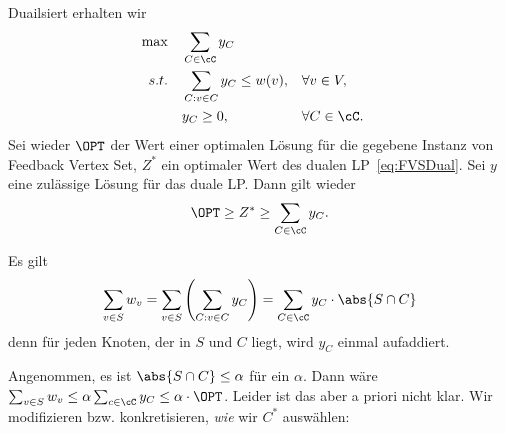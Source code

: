 \documentclass[language=ngerman,algolist]{TemplateLecture}
\begin{document}
Duailsiert erhalten wir 
\begin{equation}
    \begin{aligned}
        \max \quad & \sum_{C \in \cC} y_C \\
        s.t. \quad & \sum_{C: v \in C} y_C \leq w(v), && \forall v \in V, \\
                   & y_C \geq 0, && \forall C \in \cC.
    \end{aligned}\label{eq:FVSDual}
\end{equation}
Sei wieder $\OPT$ der Wert einer optimalen Lösung für die gegebene Instanz von Feedback Vertex Set, $Z^*$ ein optimaler Wert des dualen LP~\eqref{eq:FVSDual}. Sei $y$ eine zulässige Lösung für das duale LP. Dann gilt wieder 
\begin{equation*}
    \OPT \geq Z^* \geq \sum_{C \in \cC} y_C.
\end{equation*}

\begin{algorithm}[h]
    \caption{\textsc{PrimalDual-FVS}}\label{alg:primalDualFVS}
    \begin{algorithmic}[1]
         
        \EndWhile{}
    \end{algorithmic}
\end{algorithm}

Es gilt 
\begin{equation*}
    \sum_{v \in S} w_v = \sum_{v \in S} \left( \sum_{C : v \in C} y_C \right) = \sum_{C \in \cC} y_C \cdot \abs{S \cap C}
\end{equation*}
denn für jeden Knoten, der in $S$ und $C$ liegt, wird $y_C$ einmal aufaddiert.

Angenommen, es ist $\abs{S \cap C} \leq \alpha$ für ein $\alpha$. Dann wäre $\sum_{v \in S} w_v \leq \alpha \sum_{c \in \cC} y_C \leq \alpha \cdot \OPT$. Leider ist das aber a priori nicht klar. Wir modifizieren bzw. konkretisieren, \emph{wie} wir $C^*$ auswählen:
\end{document}
